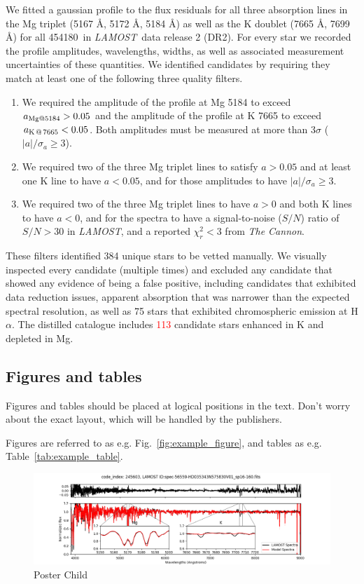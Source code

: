 \documentclass[a4paper,fleqn,usenatbib]{mnras}
\newcommand{\todo}[1]{\textcolor{red}{#1}}
\newcommand{\LamostGiants}{454180}
\newcommand{\project}[1]{\emph{#1}}
\newcommand{\lamost}{\project{LAMOST}}
\newcommand{\tc}{\project{The Cannon}}
\begin{document}
We fitted a gaussian profile to the flux residuals for all three absorption lines in the Mg triplet (5167 \AA, 5172 \AA, 5184 \AA) as well as the K doublet (7665 \AA, 7699 \AA) for all \LamostGiants\ in \lamost\ data release 2 (DR2). For every star we recorded the profile amplitudes, wavelengths, widths, as well as associated measurement uncertainties of these quantities. We identified candidates by requiring they match at least one of the following three quality filters.
\begin{enumerate}
\item We required the amplitude of the profile at Mg 5184 to exceed $a_{{\rm Mg} @ 5184} > 0.05$ and the amplitude of the profile at K 7665 to exceed $a_{{\rm K}\,@\,7665} < 0.05$. Both amplitudes must be measured at more than $3\sigma$ ($|a|/\sigma_{a} \geq 3$).
\item We required two of the three Mg triplet lines to satisfy $a > 0.05$ and at least one K line to have $a < 0.05$, and for those amplitudes to have $|a|/\sigma_{a} \geq 3$.
\item We required two of the three Mg triplet lines to have $a > 0$ and both K lines to have $a < 0$, and for the spectra to have a signal-to-noise ($S/N$) ratio of $S/N > 30$ in \lamost, and a reported $\chi_{r}^2 < 3$ from \tc.
\end{enumerate} 
 
These filters identified 384 unique stars to be vetted manually. We visually inspected every candidate (multiple times) and excluded any candidate that showed any evidence of being a false positive, including candidates that exhibited data reduction issues, apparent absorption that was narrower than the expected spectral resolution, as well as 75 stars that exhibited chromospheric emission at H$\alpha$. The distilled catalogue includes \todo{113} candidate stars enhanced in K and depleted in Mg.


\subsection{Figures and tables}

Figures and tables should be placed at logical positions in the text. Don't
worry about the exact layout, which will be handled by the publishers.

Figures are referred to as e.g. Fig.~\ref{fig:example_figure}, and tables as
e.g. Table~\ref{tab:example_table}.




\begin{figure}
	\includegraphics[width=\columnwidth]{posterchildof13.png}
    \caption{Poster Child}
    \label{mhist}
\end{figure}
\end{document}
